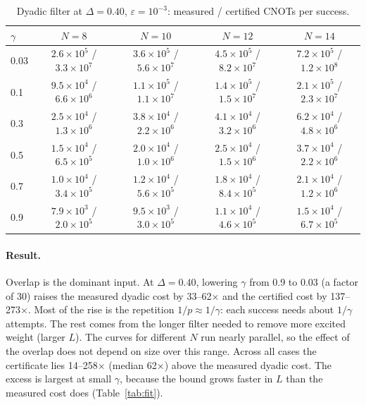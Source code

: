 \documentclass[10pt]{article}
\begin{document}
\begin{table}[h]\centering\small
\caption{Dyadic filter at $\Delta=0.40$, $\varepsilon=10^{-3}$: measured / certified CNOTs per success.}
\begin{tabular}{lcccc}\toprule
$\gamma$ & $N=8$ & $N=10$ & $N=12$ & $N=14$ \\\midrule
0.03 & $2.6\times10^{5}$ / $3.3\times10^{7}$ & $3.6\times10^{5}$ / $5.6\times10^{7}$ & $4.5\times10^{5}$ / $8.2\times10^{7}$ & $7.2\times10^{5}$ / $1.2\times10^{8}$ \\
0.1 & $9.5\times10^{4}$ / $6.6\times10^{6}$ & $1.1\times10^{5}$ / $1.1\times10^{7}$ & $1.4\times10^{5}$ / $1.5\times10^{7}$ & $2.1\times10^{5}$ / $2.3\times10^{7}$ \\
0.3 & $2.5\times10^{4}$ / $1.3\times10^{6}$ & $3.8\times10^{4}$ / $2.2\times10^{6}$ & $4.1\times10^{4}$ / $3.2\times10^{6}$ & $6.2\times10^{4}$ / $4.8\times10^{6}$ \\
0.5 & $1.5\times10^{4}$ / $6.5\times10^{5}$ & $2.0\times10^{4}$ / $1.0\times10^{6}$ & $2.5\times10^{4}$ / $1.5\times10^{6}$ & $3.7\times10^{4}$ / $2.2\times10^{6}$ \\
0.7 & $1.0\times10^{4}$ / $3.4\times10^{5}$ & $1.2\times10^{4}$ / $5.6\times10^{5}$ & $1.8\times10^{4}$ / $8.4\times10^{5}$ & $2.1\times10^{4}$ / $1.2\times10^{6}$ \\
0.9 & $7.9\times10^{3}$ / $2.0\times10^{5}$ & $9.5\times10^{3}$ / $3.0\times10^{5}$ & $1.1\times10^{4}$ / $4.6\times10^{5}$ & $1.5\times10^{4}$ / $6.7\times10^{5}$ \\
\bottomrule\end{tabular}
\end{table}

\paragraph{Result.} Overlap is the dominant input. At $\Delta=0.40$, lowering $\gamma$ from 0.9 to 0.03 (a factor
of 30) raises the measured dyadic cost by 33--62$\times$ and the certified cost by 137--273$\times$. Most of the
rise is the repetition $1/p\approx1/\gamma$: each success needs about $1/\gamma$ attempts. The rest comes from the
longer filter needed to remove more excited weight (larger $L$). The curves for different $N$ run nearly parallel,
so the effect of the overlap does not depend on size over this range. Across all cases the certificate lies
14--258$\times$ (median 62$\times$) above the measured dyadic cost. The excess is largest at small $\gamma$, because the bound grows faster in
$L$ than the measured cost does (Table~\ref{tab:fit}).
\end{document}

